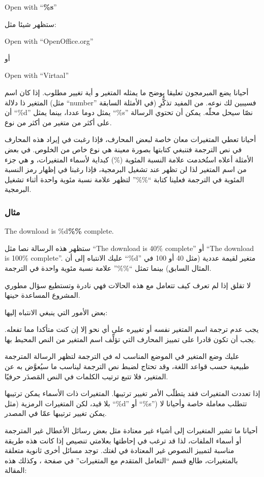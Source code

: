 Open with “{\bf \%s}”

ستظهر شيئا مثل:

Open with “OpenOffice.org”

أو

Open with “Virtaal”

أحيانا يضع المبرمجون تعليقا يوضح ما يمثله المتغير و أية تغيير مطلوب. إذا
كان اسم المتغير ذا دلالة (مثل “number” في الأمثلة السابقة) فسيبين لك
نوعه. من المفيد تذكُّرِ أن “‪\%d‬” يمثل دوما عددا، بينما يمثل “‪\%s‬”
نصّا سيحل محلّه. يمكن أن تحتوي الرسالة على أكثر من متغير من أكثر من
نوع.

أحيانا تعطي المتغيرات معان خاصة لبعض المحارف، فإذا رغبت في إيراد هذه
المحارف في نص الترجمة فتنبغي كتابتها بصورة معينة هي نوع خاص من الخلوص.
في بعض الأمثلة أعلاه استُخدمت علامة النسبة المئوية (\%) كبداية لأسماء
المتغيرات، و هي جزء من اسم المتغير لذا لن تظهر عند تشغيل البرمجية، فإذا
رغبنا في إظهار رمز النسبة المئوية في الترجمة فعلينا كتابة “\%\%” لتظهر
علامة نسبة مئوية واحدة أثناء تشغيل البرمجية.

\subsubsection{مثال}
The download is \%d{\bf \%\%} complete.

ستظهر هذه الرسالة نصا مثل “The download is 40\% complete” أو “The
download is 100\% complete”. عليك الانتباه إلى أن ‪“\%d”‬ متغير لقيمة
عددية (مثل 40 أو 100 في المثال السابق) بينما تمثل “\%\%” علامة نسبة
مئوية واحدة في الترجمة.

لا تقلق إذا لم تعرف كيف تتعامل مع هذه الحالات فهي نادرة وتستطيع سؤال
مطوري المشروع المساعدة حينها.

بعض الأمور التي ينبغي الانتباه إليها:

\startitemize[1]
\item يجب عدم ترجمة اسم المتغير نفسه أو تغييره على أي نحو إلا إن كنت
متأكدا مما تفعله. يجب أن تكون قادرا على تمييز المحارف التي تؤلِّف اسم
المتغير من النص المحيط بها.
\item عليك وضع المتغير في الموضع المناسب له في الترجمة لتظهر الرسالة
المترجمة طبيعية حسب قواعد اللغة، وقد تحتاج لضبط نص الترجمة ليناسب ما
سيُعوَّض به عن المتغير، فلا تتبع ترتيب الكلمات في النص المَصدَر حرفيًا.
\item إذا تعددت المتغيرات فقد يتطلّب الأمر تغيير ترتيبها. المتغيرات ذات
الأسماء يمكن ترتيبها بلا قيد، لكن المتغيرات الرمزية (مثل “‪\%d‬” أو
“‪\%s‬”) تتطلب معاملة خاصة وأحيانا لا يمكن تغيير ترتيبها عمّا في
المصدر.
\item أحيانا ما تشير المتغيرات إلى أشياء غير معتادة مثل بعض رسائل
الأعطال غير المترجمة أو أسماء الملفات، لذا قد ترغب في إحاطتها بعلامتي
تنصيص إذا كانت هذه طريقة مناسبة لتمييز النصوص غير المعتادة في لغتك.
\stopitemize
توجد مسائل أخرى ثانوية متعلقة بالمتغيرات، طالع قسم “التعامل المتقدم مع
المتغيرات” في صفحة ، وكذلك هذه المقالة:

